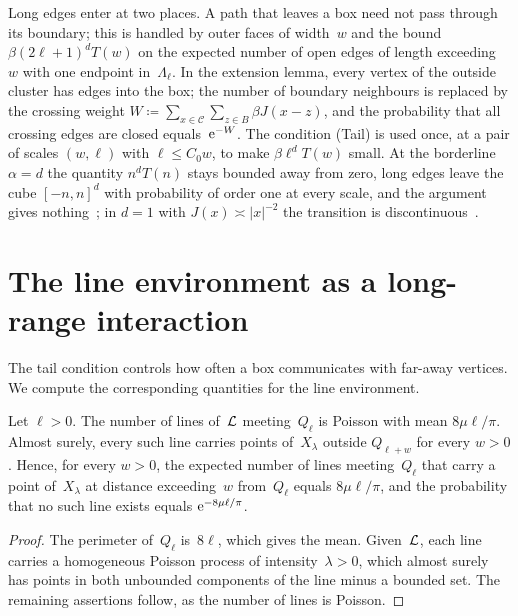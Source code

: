 \documentclass[11pt,letterpaper]{article}
\begin{document}
Long edges enter at two places. A path that leaves a box need not pass through its boundary; this is handled by outer faces of width~$w$ and the bound $\beta(2\ell+1)^dT(w)$ on the expected number of open edges of length exceeding~$w$ with one endpoint in~$\Lambda_\ell$. In the extension lemma, every vertex of the outside cluster has edges into the box; the number of boundary neighbours is replaced by the crossing weight $W\coloneqq\sum_{x\in\mathcal C}\sum_{z\in B}\beta J(x-z)$, and the probability that all crossing edges are closed equals~$\mathrm{e}^{-W}$. The condition (Tail) is used once, at a pair of scales $(w,\ell)$ with $\ell\le C_0w$, to make $\beta\ell^dT(w)$ small. At the borderline $\alpha=d$ the quantity $n^dT(n)$ stays bounded away from zero, long edges leave the cube $[-n,n]^d$ with probability of order one at every scale, and the argument gives nothing~\cite[Remark~7.2]{Pei26}; in $d=1$ with $J(x)\asymp\lvert x\rvert^{-2}$ the transition is discontinuous~\cite{AN86}.

\section{The line environment as a long-range interaction}
\label{sec:comparison}

The tail condition controls how often a box communicates with far-away vertices. We compute the corresponding quantities for the line environment.

\begin{lemma}
\label{lem:lines}
Let $\ell>0$. The number of lines of~$\mathcal L$ meeting~$Q_\ell$ is Poisson with mean $8\mu\ell/\pi$. Almost surely, every such line carries points of~$X_\lambda$ outside $Q_{\ell+w}$ for every $w>0$. Hence, for every $w>0$, the expected number of lines meeting~$Q_\ell$ that carry a point of~$X_\lambda$ at distance exceeding~$w$ from~$Q_\ell$ equals $8\mu\ell/\pi$, and the probability that no such line exists equals $\mathrm{e}^{-8\mu\ell/\pi}$.
\end{lemma}

\begin{proof}
The perimeter of~$Q_\ell$ is~$8\ell$, which gives the mean. Given~$\mathcal L$, each line carries a homogeneous Poisson process of intensity~$\lambda>0$, which almost surely has points in both unbounded components of the line minus a bounded set. The remaining assertions follow, as the number of lines is Poisson.
\end{proof}
\end{document}

